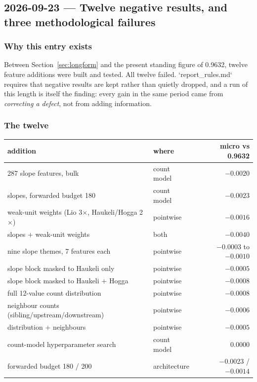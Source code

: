 \subsection{2026-09-23 --- Twelve negative results, and three methodological failures}
\label{sec:negatives}

\subsubsection*{Why this entry exists}

Between Section~\ref{sec:longform} and the present standing figure of 0.9632, twelve feature
additions were built and tested. All twelve failed. `report\_rules.md` requires that negative
results are kept rather than quietly dropped, and a run of this length is itself the finding:
every gain in the same period came from \emph{correcting a defect}, not from adding information.

\subsubsection*{The twelve}

\begin{center}\small
\begin{tabular}{llr}
\toprule
addition & where & micro vs 0.9632 \\
\midrule
287 slope features, bulk & count model & $-0.0020$ \\
slopes, forwarded budget 180 & count model & $-0.0023$ \\
weak-unit weights (Lio 3$\times$, Haukeli/Hogga 2$\times$) & pointwise & $-0.0016$ \\
slopes $+$ weak-unit weights & both & $-0.0040$ \\
nine slope themes, 7 features each & pointwise & $-0.0003$ to $-0.0010$ \\
slope block masked to Haukeli only & pointwise & $-0.0005$ \\
slope block masked to Haukeli $+$ Hogga & pointwise & $-0.0008$ \\
full 12-value count distribution & pointwise & $-0.0008$ \\
neighbour counts (sibling/upstream/downstream) & pointwise & $-0.0006$ \\
distribution $+$ neighbours & pointwise & $-0.0005$ \\
count-model hyperparameter search & count model & $0.0000$ \\
forwarded budget 180 / 200 & architecture & $-0.0023$ / $-0.0014$ \\
\bottomrule
\end{tabular}
\end{center}

